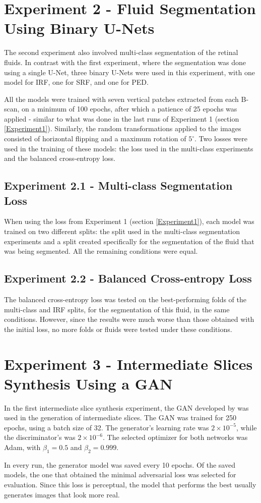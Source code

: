 \section{Experiment 2 - Fluid Segmentation Using Binary U-Nets}\label{Experiment2}

The second experiment also involved multi-class segmentation of the retinal fluids. In contrast with the first experiment, where the segmentation was done using a single U-Net, three binary U-Nets were used in this experiment, with one model for IRF, one for SRF, and one for PED.
\par
All the models were trained with seven vertical patches extracted from each B-scan, on a minimum of 100 epochs, after which a patience of 25 epochs was applied - similar to what was done in the last runs of Experiment 1 (section \ref{Experiment1}). Similarly, the random transformations applied to the images consisted of horizontal flipping and a maximum rotation of $5^{\circ}$. Two losses were used in the training of these models: the loss used in the multi-class experiments and the balanced cross-entropy loss.

\subsection{Experiment 2.1 - Multi-class Segmentation Loss}

When using the loss from Experiment 1 (section \ref{Experiment1}), each model was trained on two different splits: the split used in the multi-class segmentation experiments and a split created specifically for the segmentation of the fluid that was being segmented. All the remaining conditions were equal.

\subsection{Experiment 2.2 - Balanced Cross-entropy Loss}

The balanced cross-entropy loss was tested on the best-performing folds of the multi-class and IRF splits, for the segmentation of this fluid, in the same conditions. However, since the results were much worse than those obtained with the initial loss, no more folds or fluids were tested under these conditions.

\section{Experiment 3 - Intermediate Slices Synthesis Using a GAN}
In the first intermediate slice synthesis experiment, the GAN developed by \textcite{Tran2020} was used in the generation of intermediate slices. The GAN was trained for 250 epochs, using a batch size of 32. The generator's learning rate was $2 \times 10^{-5}$, while the discriminator's was $2 \times 10^{-6}$. The selected optimizer for both networks was Adam, with $\beta_{1}=0.5$ and $\beta_{2}=0.999$.
\par
In every run, the generator model was saved every 10 epochs. Of the saved models, the one that obtained the minimal adversarial loss was selected for evaluation. Since this loss is perceptual, the model that performs the best usually generates images that look more real.

